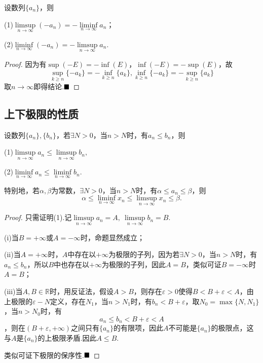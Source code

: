 \begin{proposition}
	设数列$\{a_n\}$，则
	
	(1)$\limsup\limits_{n \to \infty}(-a_n)=-\liminf\limits_{n \to \infty}a_n$；
	
	(2)$\liminf\limits_{n \to \infty}(-a_n)=-\limsup\limits_{n \to \infty}a_n$.
\end{proposition}
\begin{proof}
	因为有$\sup(-E)=-\inf(E)$，$\inf(-E)=-\sup(E)$，故
	$$\sup\limits_{k\geqslant n}\{-a_k\}=-\inf\limits_{k\geqslant n}\{a_k\},\inf\limits_{k\geqslant n}\{-a_k\}=-\sup\limits_{k\geqslant n}\{a_k\}$$
	取$n\to\infty$即得结论.$\hfill\blacksquare$
\end{proof}
\subsection{上下极限的性质}
\begin{theorem}[保序性]
	设数列$\{a_n\},\{b_n\}$，若$\exists N>0$，当$n>N$时，有$a_n\leqslant b_n$，则
	
	(1)$\limsup\limits_{n\to\infty}a_n\leqslant\limsup\limits_{n\to\infty}b_n,$
	
	(2)$\liminf\limits_{n\to\infty}a_n\leqslant\liminf\limits_{n\to\infty}b_n.$
	
	特别地，若$\alpha,\beta$为常数，$\exists N>0$，当$n>N$时，有$\alpha\leqslant a_n\leqslant \beta$，则$$\alpha\leqslant\liminf\limits_{n\to\infty}x_n\leqslant\limsup\limits_{n\to\infty}x_n\leqslant\beta.$$
\end{theorem}
\begin{proof}
	只需证明(1).记$\limsup\limits_{n\to\infty}a_n=A,\ \limsup\limits_{n\to\infty}b_n=B.$
	
	(i)当$B=+\infty$或$A=-\infty$时，命题显然成立；
	
	(ii)当$A=+\infty$时，$A$中存在以$+\infty$为极限的子列，因为若$\exists N>0$，当$n>N$时，有$a_n\leqslant b_n$，所以$B$中也存在以$+\infty$为极限的子列，因此$A=B$，类似可证$B=-\infty$时$A=B$；
	
	(iii)当$A,B\in\mathbb{R}$时，用反证法，假设$A>B$，则存在$\varepsilon>0$使得$B<B+\varepsilon<A$，由上极限的$\varepsilon-N$定义，存在$N_1$，当$n>N_1$时，有$b_n<B+\varepsilon$，取$N_0=\max\{N,N_1\}$，当$n>N_0$时，有
	$$a_n\leqslant b_n<B+\varepsilon<A$$，则在$(B+\varepsilon,+\infty)$之间只有$\{a_n\}$的有限项，因此$A$不可能是$\{a_n\}$的极限点，这与$A$是$\{a_n\}$的上极限矛盾.因此$A\leqslant B.$
	
	类似可证下极限的保序性.$\hfill\blacksquare$
\end{proof}
